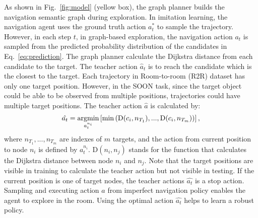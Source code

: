 \documentclass[final]{cvpr}
\begin{document}
As shown in Fig.~\ref{fig:model} (yellow box), the graph planner builds the navigation semantic graph during exploration. 
In imitation learning, the navigation agent uses the ground truth action $a^*_t$ to sample the trajectory. 
However, in each step $t$, in graph-based exploration, the navigation action $a_t$ is sampled from the predicted probability distribution of the candidates in Eq.~\ref{eq:prediction}. 
The graph planner calculate the Dijkstra distance from each candidate to the target. 
The teacher action $\hat{a}_t$ is to reach the candidate which is the closest to the target. 
Each trajectory in Room-to-room (R2R) dataset has only one target position. 
However, in the SOON task, since the target object could be able to be observed from multiple positions, trajectories could have multiple target positions. The teacher action $\hat{a}$ is calculated by:
\begin{equation}
\vspace{-1.0 em}
\hat{a_t} = \underset{a_t^{n_i}}{\mathrm{argmin}} \left [ \mathrm{min}\left (   \mathrm{D}(c_i, n_{T_1}),...,\mathrm{D}(c_i, n_{T_m}) \right ) \right ], 
\end{equation}
where $n_{T_1},...,n_{T_m}$ are indexes of $m$ targets, and the action from current position to node $n_i$ is defined by $a_t^{n_i}$. $\mathrm{D}(n_i, n_j)$ stands for the function that calculates the Dijkstra distance between node $n_i$ and $n_j$. Note that the target positions are visible in training to calculate the teacher action but not visible in testing. If the current position is one of target nodes, the teacher actions $\hat{a_t}$ is a stop action. 
Sampling and executing action $a$ from imperfect navigation policy enables the agent to explore in the room. 
Using the optimal action $\hat{a_t}$ helps to learn a robust policy. 
\end{document}
